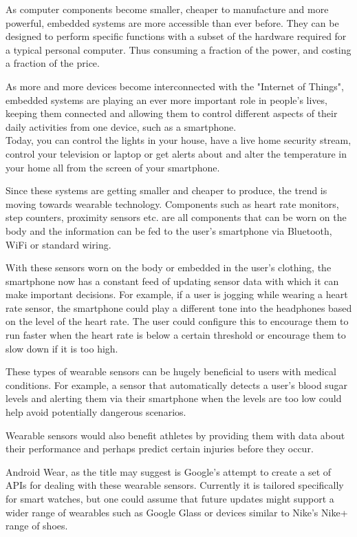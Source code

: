 
As computer components become smaller, cheaper to manufacture and more powerful,
embedded systems are more accessible than ever before. They can be designed to
perform specific functions with a subset of the hardware required for a typical
personal computer. Thus consuming a fraction of the power, and costing a fraction
of the price.

As more and more devices become interconnected with the "Internet of Things",
embedded systems are playing an ever more important role in people's lives,
keeping them connected and allowing them to control different aspects of their
daily activities from one device, such as a smartphone.\\
Today, you can control the lights in your house, have a live home security
stream, control your television or laptop or get alerts about and alter the
temperature in your home all from the screen of your smartphone.

Since these systems are getting smaller and cheaper to produce, the trend is
moving towards wearable technology. Components such as heart rate monitors,
step counters, proximity sensors etc. are all components that can be worn on
the body and the information can be fed to the user's smartphone via Bluetooth,
WiFi or standard wiring.

With these sensors worn on the body or embedded in the user's clothing, the 
smartphone now has a constant feed of updating sensor data with which it can
make important decisions. For example, if a user is jogging while wearing a
heart rate sensor, the smartphone could play a different tone into the
headphones based on the level of the heart rate. The user could configure this
to encourage them to run faster when the heart rate is below a certain
threshold or encourage them to slow down if it is too high.

These types of wearable sensors can be hugely beneficial to users with medical
conditions. For example, a sensor that automatically detects a user's blood
sugar levels and alerting them via their smartphone when the levels are too
low could help avoid potentially dangerous scenarios.

Wearable sensors would also benefit athletes by providing them with data about
their performance and perhaps predict certain injuries before they occur.

Android Wear, as the title may suggest is Google's attempt to create a set of
APIs for dealing with these wearable sensors. Currently it is tailored
specifically for smart watches, but one could assume that future updates might
support a wider range of wearables such as Google Glass or devices similar to
Nike's Nike+ range of shoes.

